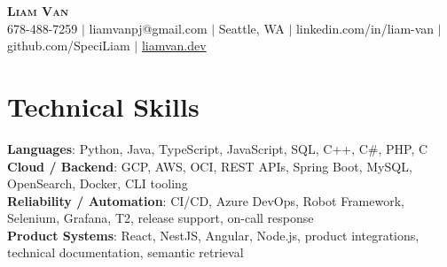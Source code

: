 \documentclass[letterpaper,11pt]{article}
\begin{document}

%
\begin{center}
    \textbf{\Huge \scshape Liam Van} \\ \vspace{1pt}
    \small 678-488-7259 $|$ \small {liamvanpj@gmail.com} $|$ Seattle, WA
 {{$|$ linkedin.com/in/liam-van} {$|$ github.com/SpeciLiam} {$|$ \href{https://liamvan.dev}{liamvan.dev}}}

\end{center}

\section{Technical Skills}
 \begin{itemize}[leftmargin=0.15in, label={}]
    \small{\item{
     \textbf{Languages}{: Python, Java, TypeScript, JavaScript, SQL, C++, C\#, PHP, C} \\
     \textbf{Cloud / Backend}{: GCP, AWS, OCI, REST APIs, Spring Boot, MySQL, OpenSearch, Docker, CLI tooling} \\
     \textbf{Reliability / Automation}{: CI/CD, Azure DevOps, Robot Framework, Selenium, Grafana, T2, release support, on-call response} \\
     \textbf{Product Systems}{: React, NestJS, Angular, Node.js, product integrations, technical documentation, semantic retrieval} \\
    }}
 \end{itemize}
%

\end{document}
